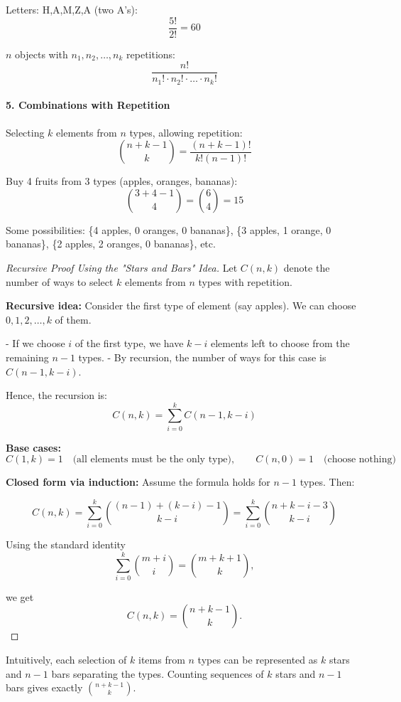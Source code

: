 \begin{eg}
Letters: H,A,M,Z,A (two A's):
\[
\frac{5!}{2!} = 60
\]
\end{eg}
\begin{explanation}
$n$ objects with $n_1, n_2, \dots, n_k$ repetitions:
\[
\frac{n!}{n_1! \cdot n_2! \cdot \dots \cdot n_k!}
\]
\end{explanation}

\paragraph{5. Combinations with Repetition}  
\begin{explanation}
Selecting $k$ elements from $n$ types, allowing repetition:
\[
\binom{n+k-1}{k} = \frac{(n+k-1)!}{k!(n-1)!}
\]
\end{explanation}

\begin{eg}
Buy 4 fruits from 3 types (apples, oranges, bananas):
\[
\binom{3+4-1}{4} = \binom{6}{4} = 15
\]

Some possibilities: \{4 apples, 0 oranges, 0 bananas\}, \{3 apples, 1 orange, 0 bananas\}, \{2 apples, 2 oranges, 0 bananas\}, etc.
\end{eg}

\begin{proof}[Recursive Proof Using the "Stars and Bars" Idea]
Let $C(n,k)$ denote the number of ways to select $k$ elements from $n$ types with repetition.  

\textbf{Recursive idea:} Consider the first type of element (say apples). We can choose $0, 1, 2, \dots, k$ of them.  

- If we choose $i$ of the first type, we have $k-i$ elements left to choose from the remaining $n-1$ types.  
- By recursion, the number of ways for this case is $C(n-1, k-i)$.  

Hence, the recursion is:
\[
C(n,k) = \sum_{i=0}^{k} C(n-1, k-i)
\]

\textbf{Base cases:}  
\[
C(1,k) = 1 \quad \text{(all elements must be the only type)}, \qquad C(n,0) = 1 \quad \text{(choose nothing)}
\]

\textbf{Closed form via induction:} Assume the formula holds for $n-1$ types. Then:

\[
C(n,k) = \sum_{i=0}^{k} \binom{(n-1)+(k-i)-1}{k-i} = \sum_{i=0}^{k} \binom{n+k-i-3}{k-i}
\]

Using the standard identity
\[
\sum_{i=0}^{k} \binom{m+i}{i} = \binom{m+k+1}{k},
\]

we get
\[
C(n,k) = \binom{n+k-1}{k}.
\]

\end{proof}
\begin{remark}
Intuitively, each selection of $k$ items from $n$ types can be represented as $k$ stars and $n-1$ bars separating the types. Counting sequences of $k$ stars and $n-1$ bars gives exactly $\binom{n+k-1}{k}$.
\end{remark}

